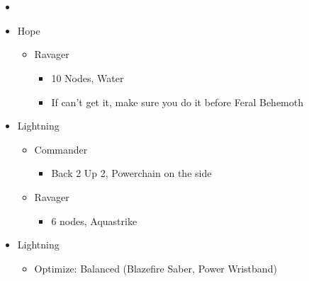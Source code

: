 \documentclass{report}
\begin{document}





\chapter{}

\begin{menu}
\begin{itemize}
    \paradigm
    \begin{itemize}
        \item {}%
{\paradigmline{\textit{\rav}}{\textit{\com}}{}}%
{\paradigmline{(\med)}{(\com)}{}}%
{\paradigmline{\syn}{(\rav)}{}}%
{\paradigmline{\rav}{\rav}{}}%
{\paradigmline{\rav}{[\rav]}{}}%
{\paradigmline{[\rav]}{\com}{}}
    \end{itemize}
    \crystarium
    \begin{itemize}
        \item Hope
        \begin{itemize}
            \item Ravager
            \begin{itemize}
                \item 10 Nodes, Water
                \item If can't get it, make sure you do it before Feral Behemoth
            \end{itemize}
        \end{itemize}
        \item Lightning
        \begin{itemize}
            \item Commander
            \begin{itemize}
                \item Back 2 Up 2, Powerchain on the side
            \end{itemize}
            \item Ravager
            \begin{itemize}
                \item 6 nodes, Aquastrike
            \end{itemize}
        \end{itemize}
    \end{itemize}
    \equip
    \begin{itemize}
        \item Lightning
        \begin{itemize}
            \item Optimize: Balanced (Blazefire Saber, Power Wristband)
        \end{itemize}
    \end{itemize}
\end{itemize}
\end{menu}
\end{document}
